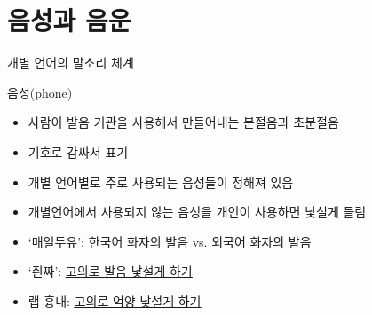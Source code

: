 \documentclass[11pt, aspectratio=169]{beamer}
\newcommand{\textds}[1]{{\ipafont #1}}
\begin{document}
\section{음성과 음운}

\begin{frame}[t]{개별 언어의 말소리 체계}
    \begin{block}{음성(phone)}
        \begin{itemize}
            \item 사람이 발음 기관을 사용해서 만들어내는 분절음과 초분절음
            \item \textds{[ ]} 기호로 감싸서 표기
            \item 개별 언어별로 주로 사용되는 음성들이 정해져 있음
            \item 개별언어에서 사용되지 않는 음성을 개인이 사용하면 낯설게 들림
        \end{itemize}
    \end{block}
    \begin{itemize}
        \item ‘매일두유’: 한국어 화자의 발음 vs. 외국어 화자의 발음
        \item ‘즨짜’:  \href{https://youtu.be/FB6jrxNt6Qk}{\underline{고의로 발음 낯설게 하기}}
        \item 랩 흉내: \href{https://youtu.be/AMiApAli848}{\underline{고의로 억양 낯설게 하기}}
    \end{itemize}
\end{frame}
\end{document}
